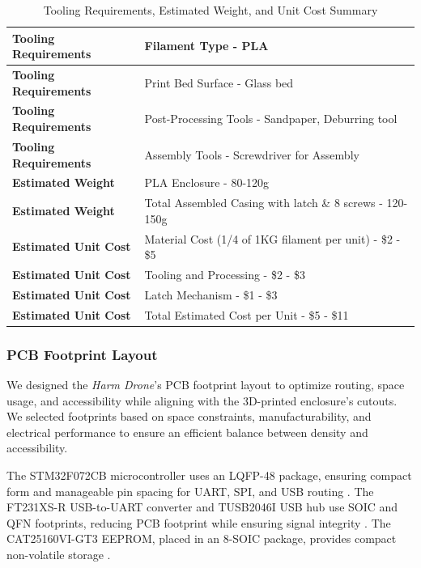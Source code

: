 \documentclass[12pt]{article}
\begin{document}
\begin{table}[h!]
\centering
\begin{tabular}{|l|l|}
\hline
\textbf{Tooling Requirements} & Filament Type - PLA \\ \hline
\textbf{Tooling Requirements} & Print Bed Surface - Glass bed \\ \hline
\textbf{Tooling Requirements} & Post-Processing Tools - Sandpaper, Deburring tool \\ \hline
\textbf{Tooling Requirements} & Assembly Tools - Screwdriver for Assembly \\ \hline
\textbf{Estimated Weight} & PLA Enclosure - 80-120g \\ \hline
\textbf{Estimated Weight} & Total Assembled Casing with latch \& 8 screws - 120-150g \\ \hline
\textbf{Estimated Unit Cost} & Material Cost (1/4 of 1KG filament per unit) - \$2 - \$5 \\ \hline
\textbf{Estimated Unit Cost} & Tooling and Processing - \$2 - \$3 \\ \hline
\textbf{Estimated Unit Cost} & Latch Mechanism - \$1 - \$3 \\ \hline
\textbf{Estimated Unit Cost} & Total Estimated Cost per Unit - \$5 - \$11 \\ \hline
\end{tabular}
\caption{Tooling Requirements, Estimated Weight, and Unit Cost Summary}
\label{tooling_costs}
\end{table}
\newpage
\subsubsection{PCB Footprint Layout}

\par We designed the \textit{Harm Drone}’s PCB footprint layout to optimize routing, space usage, and accessibility while aligning with the 3D-printed enclosure’s cutouts. We selected footprints based on space constraints, manufacturability, and electrical performance to ensure an efficient balance between density and accessibility.

\par The STM32F072CB microcontroller uses an LQFP-48 package, ensuring compact form and manageable pin spacing for UART, SPI, and USB routing \cite{st2023stm32}. The FT231XS-R USB-to-UART converter and TUSB2046I USB hub use SOIC and QFN footprints, reducing PCB footprint while ensuring signal integrity \cite{ftdi2023ft231x} \cite{ti2023tusb}. The CAT25160VI-GT3 EEPROM, placed in an 8-SOIC package, provides compact non-volatile storage \cite{onsemi2023cat}.
\end{document}
